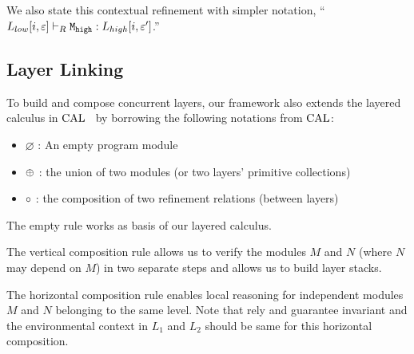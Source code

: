 {\noindent}We also state this contextual refinement with simpler notation, 
``$\ltyp{\PLayer{L_{low}}{i}{\oracle}}{R}{\codeinmath{M}_{\codeinmath{high}}}{\PLayer{L_{high}}{i}{\oracle'}}$.''



\subsection{Layer Linking}
\label{chapter:ccal:subsec:linking}


To build and compose concurrent layers, 
our framework also extends the layered calculus in $\calname$~\cite{deepspec} by 
borrowing the following notations 
from $\calname$:
\begin{itemize}
\item $\varnothing$ : An  empty program module
\item $\modulecomposekwd$ : the union of two modules (or two layers' primitive collections)
\item $\relcomposekwd$ : the composition of two refinement relations (between layers)
\end{itemize}

The empty rule works as basis of our layered calculus.
 \begin{mathpar}
\end{mathpar}

The vertical composition rule allows us
to verify the modules $M$ and $N$ (where $N$ may depend on $M$) 
in two separate steps and allows us to build layer stacks.
    \begin{mathpar}
\end{mathpar}

The horizontal composition rule enables local reasoning for independent
modules $M$ and $N$ belonging to the same level. Note that rely and guarantee invariant and the environmental context in $L_1$ and $L_2$ should 
be same for this horizontal composition.
 \begin{mathpar}
\end{mathpar}


